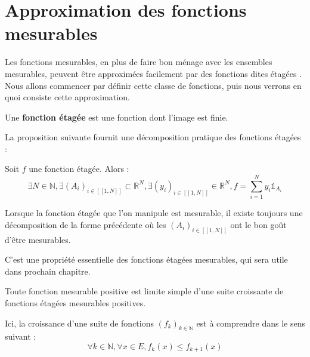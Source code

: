 \documentclass[../integ-proba.tex]{subfiles}
\begin{document}

  \section{Approximation des fonctions mesurables}

  Les fonctions mesurables, en plus de faire bon ménage avec les ensembles mesurables, peuvent être approximées facilement par des fonctions dites \og étagées \fg.
  Nous allons commencer par définir cette classe de fonctions, puis nous verrons en quoi consiste cette approximation.

  \begin{defi}
    Une \textbf{fonction étagée} est une fonction dont l'image est finie.
  \end{defi}

  La proposition suivante fournit une décomposition pratique des fonctions étagées :

  \begin{prop}
    Soit $f$ une fonction étagée.
    Alors :
    \begin{displaymath}
      \exists N \in \mathbb{N}, \exists \left(A_i\right)_{i \in [\![1,N]\!]} \subset \mathbb{R}^N, \exists \left(y_i\right)_{i \in [\![1,N]\!]} \in \mathbb{R}^N, f = \sum_{i=1}^{N}y_i\mathds{1}_{A_i}
    \end{displaymath}
  \end{prop}

  \begin{rem}
    Lorsque la fonction étagée que l'on manipule est mesurable, il existe toujours une décomposition de la forme précédente où les $\left(A_i\right)_{i\in[\![1,N]\!]}$ ont le bon goût d'être mesurables.

    C'est une propriété essentielle des fonctions étagées mesurables, qui sera utile dans prochain chapitre.
  \end{rem}

  \begin{thm}
    \label{thm:decompmes}
    Toute fonction mesurable positive est limite simple d'une suite croissante de fonctions étagées mesurables positives.
  \end{thm}

  \begin{rem}
    Ici, la croissance d'une suite de fonctions $\left(f_k\right)_{k\in \mathbb{N}}$ est à comprendre dans le sens suivant :
    \begin{displaymath}
      \forall k \in \mathbb{N}, \forall x \in E, f_k(x) \leq f_{k+1}(x)
    \end{displaymath}
  \end{rem}
\end{document}
